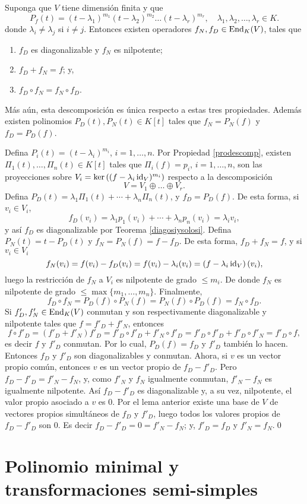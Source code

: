 \begin{teo}\label{descjorche}
Suponga que $V$ tiene dimensi\'on finita y que
\[
P_f(t)=(t-\lambda_1)^{m_1}(t-\lambda_2)^{m_2}\ldots(t-\lambda_r)^{m_r}, \quad \lambda_1,\lambda_2,\ldots,\lambda_r\in K.
\]
donde $\lambda_i\ne\lambda_j$ si $i\ne j$. Entonces existen operadores $f_N,f_D\in\operatorname{End}_K(V)$, tales que
\begin{enumerate}
\item $f_D$ es diagonalizable y $f_N$ es nilpotente;
\item $f_D+f_N=f$; y,
\item $f_D\circ f_N=f_N\circ f_D$.
\end{enumerate}
M\'as a\'un, esta descomposici\'on es \'unica respecto a estas tres propiedades. Adem\'as existen polinomios $P_D(t),P_N(t)\in K[t]$ tales que $f_N=P_N(f)$ y $f_D=P_D(f)$.
\end{teo}

\dem Defina $P_i(t)=(t-\lambda_i)^{m_i}$, $i=1,\ldots,n$. Por Propiedad \ref{prodescomp}, existen $\Pi_1(t),\ldots,\Pi_n(t)\in K[t]$ tales que $\Pi_i(f)=p_i$, $i=1,\ldots,n$, son las proyecciones sobre $V_i=\ker\left((f-\lambda_i\operatorname{id}_V)^{m_i}\right)$ respecto a la descomposici\'on 
\[
V=V_1\oplus \ldots \oplus V_r.
\]
Defina $P_D(t)=\lambda_1\Pi_1(t)+\cdots+\lambda_n\Pi_n(t)$, y $f_D=P_D(f)$. De esta forma, si $v_i\in V_i$,
\[
f_D(v_i)=\lambda_1p_1(v_i)+\cdots+\lambda_np_n(v_i)=\lambda_iv_i,
\]
y as\'i $f_D$ es diagonalizable por Teorema \ref{diagosiysolosi}. Defina $P_N(t)=t-P_D(t)$ y $f_N=P_N(f)=f-f_D$. De esta forma, $f_D+f_N=f$, y si $v_i\in V_i$
\[
f_N(v_i)=f(v_i)-f_D(v_i)=f(v_i)-\lambda_i(v_i)=\left(f-\lambda_i\operatorname{id}_V\right)(v_i),
\]
luego la restricci\'on de $f_N$ a $V_i$ es nilpotente de grado $\le m_i$. De donde $f_N$ es nilpotente de grado $\le\max\{m_1,\ldots,m_n\}$. Finalmente,
\[
f_D\circ f_N=P_D(f)\circ P_N(f)=P_N(f)\circ P_D(f)=f_N\circ f_D.
\]
Si $f'_D,f'_N\in\operatorname{End}_K(V)$ conmutan y son respectivamente diagonalizable y nilpotente tales que $f=f'_D+f'_N$, entonces
\[
f\circ f'_D=(f'_D+f'_N)f'_D=f'_D\circ f'_D+f'_N\circ f'_D=f'_D\circ f'_D+f'_D\circ f'_N=f'_D\circ f,
\]
es decir $f$ y $f'_D$ conmutan. Por lo cual, $P_D(f)=f_D$ y $f'_D$ tambi\'en lo hacen.\\
Entonces $f_D$ y $f'_D$ son diagonalizables y conmutan. Ahora, si $v$ es un vector propio com\'un, entonces $v$ es un vector propio de $f_D-f'_D$. Pero $f_D-f'_D=f'_N-f_N$, y, como $f'_N$ y $f_N$ igualmente conmutan, $f'_N-f_N$ es igualmente nilpotente. As\'i $f_D-f'_D$ es diagonalizable y, a su vez, nilpotente, el valor propio asociado a $v$ es $0$. Por el lema anterior existe una base de $V$ de vectores propios simult\'aneos de $f_D$ y $f'_D$, luego todos los valores propios de $f_D-f'_D$ son $0$. Es decir $f_D-f'_D=0=f'_N-f_N$; y, $f'_D=f_D$ y $f'_N=f_N$.\qed

\section{Polinomio minimal y transformaciones semi-simples} 